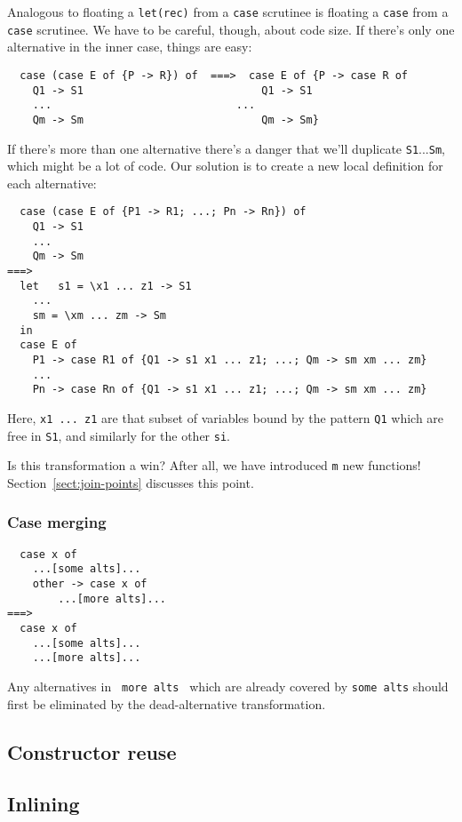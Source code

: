 \documentclass[11pt]{article}
\begin{document}
Analogous to floating a \texttt{let(rec)} from a \texttt{case} scrutinee is 
floating a \texttt{case} from a \texttt{case} scrutinee.  We have to be
careful, though, about code size.  If there's only one alternative
in the inner case, things are easy:
\begin{lstlisting}
  case (case E of {P -> R}) of  ===>  case E of {P -> case R of 
    Q1 -> S1		    				Q1 -> S1
    ...		    					...
    Qm -> Sm		    				Qm -> Sm}
\end{lstlisting}
If there's more than one alternative there's a danger
that we'll duplicate \texttt{S1}...\texttt{Sm}, which might be a lot of code.
Our solution is to create a new local definition for each 
alternative:
\begin{lstlisting}
  case (case E of {P1 -> R1; ...; Pn -> Rn}) of
    Q1 -> S1
    ...
    Qm -> Sm
===>
  let	s1 = \x1 ... z1 -> S1
	...
	sm = \xm ... zm -> Sm
  in
  case E of
    P1 -> case R1 of {Q1 -> s1 x1 ... z1; ...; Qm -> sm xm ... zm}
    ...
    Pn -> case Rn of {Q1 -> s1 x1 ... z1; ...; Qm -> sm xm ... zm}
\end{lstlisting}
Here, \texttt{x1 ... z1} are that subset of 
variables bound by the pattern \texttt{Q1} which are free in \texttt{S1}, and
similarly for the other \texttt{si}.

Is this transformation a win?  After all, we have introduced \texttt{m} new
functions!  Section~\ref{sect:join-points} discusses this point.

\subsubsection{Case merging}

\begin{lstlisting}
  case x of
    ...[some alts]...
    other -> case x of
		...[more alts]...
===>
  case x of
    ...[some alts]...
    ...[more alts]...
\end{lstlisting}
Any alternatives in \texttt{ more alts } which are already covered by \texttt{some alts}
should first be eliminated by the dead-alternative transformation.


\subsection{Constructor reuse}


\subsection{Inlining}
\end{document}
